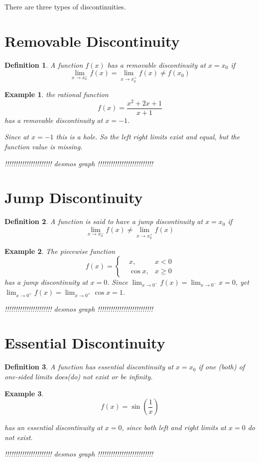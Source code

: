 \documentclass{article}
\newtheorem{definition}{Definition}
\newtheorem{ex}{Example}
\begin{document}
There are three types of discontinuities.

\section{Removable Discontinuity}
\begin{definition}
	A function $f(x)$ has a removable discontinuity at $x=x_0$ if
	\[ \lim_{x\to x_0^-} f(x)  = \lim_{x\to x_0^+} f(x) \neq f(x_0) \]
\end{definition}

\begin{ex}
	the rational function
	\[ f(x) = \frac{x^2+2x+1}{x+1} \]
	has a removable discontinuity at $x=-1$.
	
	Since at $x=-1$ this is a hole. So the left right limits exist and equal, but the function value is missing.
	
	\begin{center}
		!!!!!!!!!!!!!!!!!!!!!! desmos graph !!!!!!!!!!!!!!!!!!!!!!!!!!
	\end{center}
\end{ex}


\section{Jump Discontinuity}
\begin{definition}
	A function is said to have a jump discontinuity at $x=x_0$ if 
	\[ \lim_{x\to x_0^-} f(x) \neq \lim_{x\to x_0^+} f(x) \]
\end{definition}


\begin{ex}
	The piecewise function
	\[ f(x) = \left\{ \begin{matrix}
	&x,&x<0 \\ &\cos x, &x\geq 0
	\end{matrix} \right. \] 
	has a jump discontinuity at $x=0$. Since $\lim_{x\to 0^-}f(x) = \lim_{x\to 0^-} x = 0$, yet $\lim_{x\to 0^+} f(x) = \lim_{x\to 0^+} \cos x = 1$.
	
	
	\begin{center}
		!!!!!!!!!!!!!!!!!!!!!! desmos graph !!!!!!!!!!!!!!!!!!!!!!!!!!
	\end{center}
\end{ex}

\section{Essential Discontinuity}
\begin{definition}
	A function has essential discontinuity at $x=x_0$ if one (both) of one-sided limits does(do) not exist or be infinity.  
\end{definition}

\begin{ex}
	\[ f(x) = \sin\left(\frac{1}{x} \right) \]
	
	has an essential discontinuity at $x=0$, since both left and right limits at $x=0$ do not exist.
	
	\begin{center}
		!!!!!!!!!!!!!!!!!!!!!! desmos graph !!!!!!!!!!!!!!!!!!!!!!!!!!
	\end{center}
\end{ex}
\end{document}

